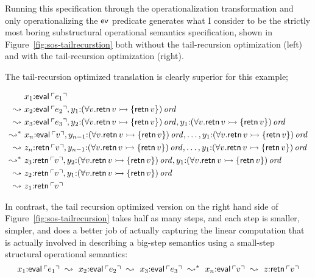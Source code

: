 Running this specification through the operationalization
transformation and only operationalizing the ${\sf ev}$ predicate
generates what I consider to be the strictly most boring substructural
operational semantics specification, shown in
Figure~\ref{fig:sos-tailrecurstion} both without the tail-recursion
optimization (left) and with the tail-recursion optimization (right). 

The tail-recursion optimized translation is clearly superior for this
example; 

\begin{align*}
& x_1{:}{\sf eval}\,{\ulcorner{e_1}\urcorner} \\
\leadsto ~ & x_2{:}{\sf eval}\,{\ulcorner{e_2}\urcorner}, 
  y_1{:}{(\forall v. {\sf retn}\,v \rightarrowtail \{ {\sf retn}\,v \})}\,{{\it ord}} \\
\leadsto ~ & x_3{:}{\sf eval}\,{\ulcorner{e_3}\urcorner}, 
  y_2{:}{(\forall v. {\sf retn}\,v \rightarrowtail \{ {\sf retn}\,v \})}\,{{\it ord}}, 
  y_1{:}{(\forall v. {\sf retn}\,v \rightarrowtail \{ {\sf retn}\,v \})}\,{{\it ord}} \\
\leadsto^* ~ & x_n{:}{\sf eval}\,{\ulcorner{v}\urcorner}, 
  y_{n-1}{:}{(\forall v. {\sf retn}\,v \rightarrowtail \{ {\sf retn}\,v \})}\,{{\it ord}}, 
  \ldots,
  y_1{:}{(\forall v. {\sf retn}\,v \rightarrowtail \{ {\sf retn}\,v \})}\,{{\it ord}} \\
\leadsto ~ & z_n{:}{\sf retn}\,{\ulcorner{v}\urcorner}, 
  y_{n-1}{:}{(\forall v. {\sf retn}\,v \rightarrowtail \{ {\sf retn}\,v \})}\,{{\it ord}}, 
  \ldots,
  y_1{:}{(\forall v. {\sf retn}\,v \rightarrowtail \{ {\sf retn}\,v \})}\,{{\it ord}} \\
\leadsto^* ~ & z_3{:}{\sf retn}\,{\ulcorner{v}\urcorner}, 
  y_2{:}{(\forall v. {\sf retn}\,v \rightarrowtail \{ {\sf retn}\,v \})}\,{{\it ord}}, 
  y_1{:}{(\forall v. {\sf retn}\,v \rightarrowtail \{ {\sf retn}\,v \})}\,{{\it ord}} \\
\leadsto ~ & z_2{:}{\sf retn}\,{\ulcorner{v}\urcorner}, 
  y_1{:}{(\forall v. {\sf retn}\,v \rightarrowtail \{ {\sf retn}\,v \})}\,{{\it ord}} \\
\leadsto ~ & z_1{:}{\sf retn}\,{\ulcorner{v}\urcorner}
\end{align*}

In contrast, the tail recursion optimized version on the right hand
side of Figure~\ref{fig:sos-tailrecursion} takes half as many steps,
and each step is smaller, simpler, and does a better job of actually
capturing the linear computation that is actually involved in
describing a big-step semantics using a small-step structural
operational semantics:
\[
x_1{:}{\sf eval}\,{\ulcorner{e_1}\urcorner} 
 ~\leadsto~
x_2{:}{\sf eval}\,{\ulcorner{e_2}\urcorner}
 ~\leadsto~
x_3{:}{\sf eval}\,{\ulcorner{e_3}\urcorner}
 ~\leadsto^*~
x_n{:}{\sf eval}\,{\ulcorner{v}\urcorner}
 ~\leadsto~ 
z{:}{\sf retn}\,{\ulcorner{v}\urcorner}
\]


